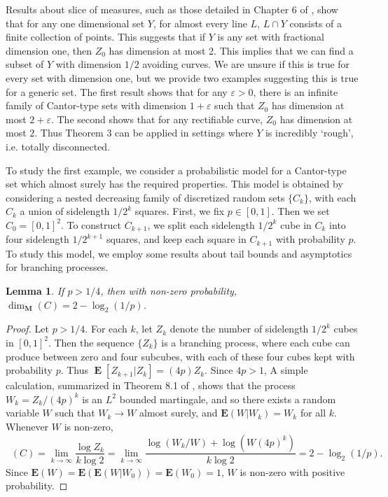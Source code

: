 \documentclass[dvipsnames,letterpaper,12pt]{article}
\numberwithin{equation}{section}
\theoremstyle{plain}
\newtheorem{lemma}{Lemma}
\DeclareMathOperator{\minkdim}{\dim_{\mathbf{M}}}
\DeclareMathOperator{\Expect}{\mathbf{E}}
\begin{document}
Results about slice of measures, such as those detailed in Chapter 6 of \cite{Matilla}, show that for any one dimensional set $Y$, for almost every line $L$, $L \cap Y$ consists of a finite collection of points. This suggests that if $Y$ is any set with fractional dimension one, then $Z_0$ has dimension at most 2. This implies that we can find a subset of $Y$ with dimension $1/2$ avoiding curves. We are unsure if this is true for every set with dimension one, but we provide two examples suggesting this is true for a generic set. The first result shows that for any $\varepsilon > 0$, there is an infinite family of Cantor-type sets with dimension $1 + \varepsilon$ such that $Z_0$ has dimension at most $2 + \varepsilon$. The second shows that for any rectifiable curve, $Z_0$ has dimension at most $2$. Thus Theorem 3 can be applied in settings where $Y$ is incredibly `rough', i.e. totally disconnected.

To study the first example, we consider a probabilistic model for a Cantor-type set which almost surely has the required properties. This model is obtained by considering a nested decreasing family of discretized random sets $\{ C_k \}$, with each $C_k$ a union of sidelength $1/2^k$ squares. First, we fix $p \in [0,1]$. Then we set $C_0 = [0,1]^2$. To construct $C_{k+1}$, we split each sidelength $1/2^k$ cube in $C_k$ into four sidelength $1/2^{k+1}$ squares, and keep each square in $C_{k+1}$ with probability $p$. To study this model, we employ some results about tail bounds and asymptotics for branching processes.

\begin{lemma} \label{randomdimension}
	If $p > 1/4$, then with non-zero probability, $\dim_{\mathbf{M}}(C) = 2 - \log_2(1/p)$.
\end{lemma}
\begin{proof}
	Let $p > 1/4$. For each $k$, let $Z_k$ denote the number of sidelength $1/2^k$ cubes in $[0,1]^2$. Then the sequence $\{ Z_k \}$ is a branching process, where each cube can produce between zero and four subcubes, with each of these four cubes kept with probability $p$. Thus $\Expect[Z_{k+1}|Z_k] = (4p) Z_k$. Since $4p > 1$, A simple calculation, summarized in Theorem 8.1 of \cite{Harris}, shows that the process $W_k = Z_k / (4p)^k$ is an $L^2$ bounded martingale, and so there exists a random variable $W$ such that $W_k \to W$ almost surely, and $\mathbf{E}(W|W_k) = W_k$ for all $k$. Whenever $W$ is non-zero,
	\[ \minkdim(C) = \lim_{k \to \infty} \frac{\log Z_k}{k \log 2} = \lim_{k \to \infty} \frac{\log(W_k/W) + \log(W (4p)^k)}{k \log 2} = 2 - \log_2(1/p). \]
	Since $\mathbf{E}(W) = \mathbf{E}(\mathbf{E}(W|W_0)) = \mathbf{E}(W_0) = 1$, $W$ is non-zero with positive probability.
\end{proof}
\end{document}
